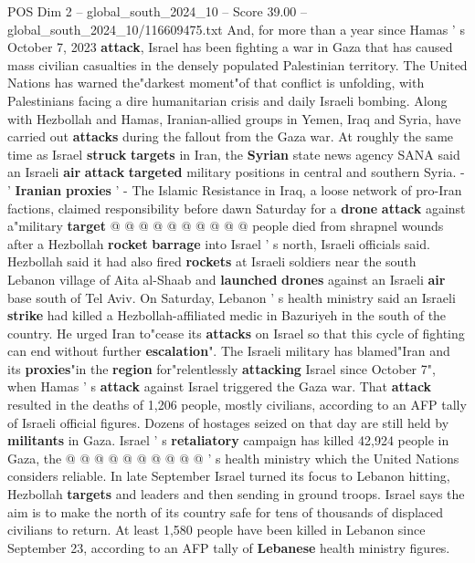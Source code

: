 \begin{textsample}{POS Dim 2 – global\_south\_2024\_10 – Score 39.00 – global\_south\_2024\_10/116609475.txt}
And, for more than a year since Hamas ' s October 7, 2023 \textbf{attack}, Israel has been fighting a war in Gaza that has caused mass civilian casualties in the densely populated Palestinian territory.
The United Nations has warned the"darkest moment"of that conflict is unfolding, with Palestinians facing a dire humanitarian crisis and daily Israeli bombing.
Along with Hezbollah and Hamas, Iranian-allied groups in Yemen, Iraq and Syria, have carried out \textbf{attacks} during the fallout from the Gaza war.
At roughly the same time as Israel \textbf{struck} \textbf{targets} in Iran, the \textbf{Syrian} state news agency SANA said an Israeli \textbf{air} \textbf{attack} \textbf{targeted} military positions in central and southern Syria. - ' \textbf{Iranian} \textbf{proxies} ' - The Islamic Resistance in Iraq, a loose network of pro-Iran factions, claimed responsibility before dawn Saturday for a \textbf{drone} \textbf{attack} against a"military \textbf{target} @ @ @ @ @ @ @ @ @ @ people died from shrapnel wounds after a Hezbollah \textbf{rocket} \textbf{barrage} into Israel ' s north, Israeli officials said.
Hezbollah said it had also fired \textbf{rockets} at Israeli soldiers near the south Lebanon village of Aita al-Shaab and \textbf{launched} \textbf{drones} against an Israeli \textbf{air} base south of Tel Aviv.
On Saturday, Lebanon ' s health ministry said an Israeli \textbf{strike} had killed a Hezbollah-affiliated medic in Bazuriyeh in the south of the country.
He urged Iran to"cease its \textbf{attacks} on Israel so that this cycle of fighting can end without further \textbf{escalation}".
The Israeli military has blamed"Iran and its \textbf{proxies}"in the \textbf{region} for"relentlessly \textbf{attacking} Israel since October 7", when Hamas ' s \textbf{attack} against Israel triggered the Gaza war.
That \textbf{attack} resulted in the deaths of 1,206 people, mostly civilians, according to an AFP tally of Israeli official figures.
Dozens of hostages seized on that day are still held by \textbf{militants} in Gaza.
Israel ' s \textbf{retaliatory} campaign has killed 42,924 people in Gaza, the @ @ @ @ @ @ @ @ @ @ ' s health ministry which the United Nations considers reliable.
In late September Israel turned its focus to Lebanon hitting, Hezbollah \textbf{targets} and leaders and then sending in ground troops.
Israel says the aim is to make the north of its country safe for tens of thousands of displaced civilians to return.
At least 1,580 people have been killed in Lebanon since September 23, according to an AFP tally of \textbf{Lebanese} health ministry figures.

\end{textsample}
